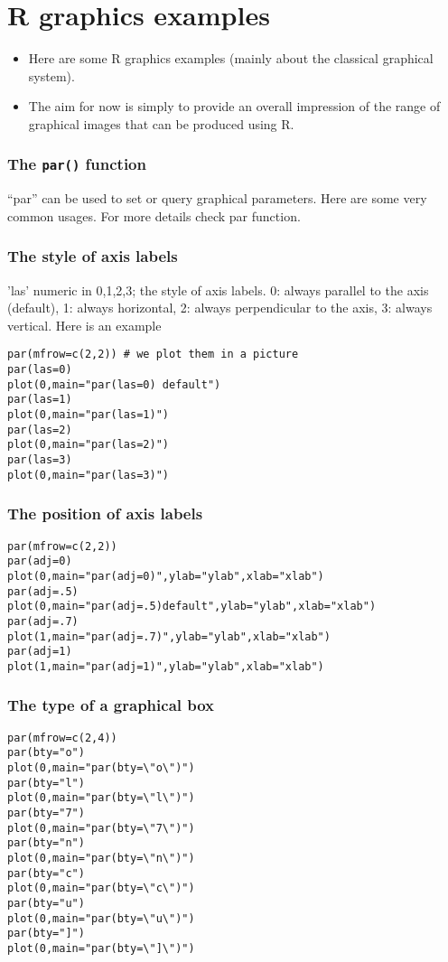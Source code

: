 \documentclass[10pt]{beamer}
\begin{document}
\section{R graphics examples}

\begin{frame}

  \begin{itemize}
  \item Here are some R graphics examples (mainly about the classical
    graphical system).

  \item The aim for now is simply to provide an overall impression of
    the range of graphical images that can be produced using R.

  \end{itemize}
\end{frame}



\begin{frame}[fragile]
\frametitle{The \texttt{par()} function}
  ``par'' can be used to set or query graphical parameters. Here are
  some very common usages. For more details check par function.
  \subsubsection{The style of axis labels}
  'las' numeric in {0,1,2,3}; the style of axis labels.  0: always
  parallel to the axis (default), 1: always horizontal, 2: always
  perpendicular to the axis, 3: always vertical.  Here is an example
\begin{verbatim}
par(mfrow=c(2,2)) # we plot them in a picture
par(las=0)
plot(0,main="par(las=0) default")
par(las=1)
plot(0,main="par(las=1)")
par(las=2)
plot(0,main="par(las=2)")
par(las=3)
plot(0,main="par(las=3)")
\end{verbatim}
\end{frame}


\begin{frame}[fragile]
  \frametitle{The position of axis labels}
\begin{verbatim}
par(mfrow=c(2,2))
par(adj=0)
plot(0,main="par(adj=0)",ylab="ylab",xlab="xlab")
par(adj=.5)
plot(0,main="par(adj=.5)default",ylab="ylab",xlab="xlab")
par(adj=.7)
plot(1,main="par(adj=.7)",ylab="ylab",xlab="xlab")
par(adj=1)
plot(1,main="par(adj=1)",ylab="ylab",xlab="xlab")
\end{verbatim}
\end{frame}

\begin{frame}[fragile]
  \frametitle{The type of a graphical box}
\begin{verbatim}
par(mfrow=c(2,4))
par(bty="o")
plot(0,main="par(bty=\"o\")")
par(bty="l")
plot(0,main="par(bty=\"l\")")
par(bty="7")
plot(0,main="par(bty=\"7\")")
par(bty="n")
plot(0,main="par(bty=\"n\")")
par(bty="c")
plot(0,main="par(bty=\"c\")")
par(bty="u")
plot(0,main="par(bty=\"u\")")
par(bty="]")
plot(0,main="par(bty=\"]\")")
\end{verbatim}

\end{frame}
\end{document}
